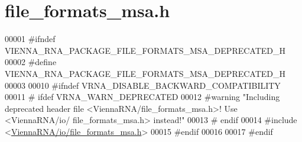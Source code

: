 \hypertarget{file__formats__msa_8h_source}{}\section{file\+\_\+formats\+\_\+msa.\+h}
\label{file__formats__msa_8h_source}

\begin{DoxyCode}
00001 \textcolor{preprocessor}{#ifndef VIENNA\_RNA\_PACKAGE\_FILE\_FORMATS\_MSA\_DEPRECATED\_H}
00002 \textcolor{preprocessor}{#define VIENNA\_RNA\_PACKAGE\_FILE\_FORMATS\_MSA\_DEPRECATED\_H}
00003 
00010 \textcolor{preprocessor}{#ifndef VRNA\_DISABLE\_BACKWARD\_COMPATIBILITY}
00011 \textcolor{preprocessor}{# ifdef VRNA\_WARN\_DEPRECATED}
00012 \textcolor{preprocessor}{#warning "Including deprecated header file <ViennaRNA/file\_formats\_msa.h>! Use <ViennaRNA/io/
      file\_formats\_msa.h> instead!"}
00013 \textcolor{preprocessor}{# endif}
00014 \textcolor{preprocessor}{#include <\hyperlink{io_2file__formats__msa_8h}{ViennaRNA/io/file\_formats\_msa.h}>}
00015 \textcolor{preprocessor}{#endif}
00016 
00017 \textcolor{preprocessor}{#endif}
\end{DoxyCode}
